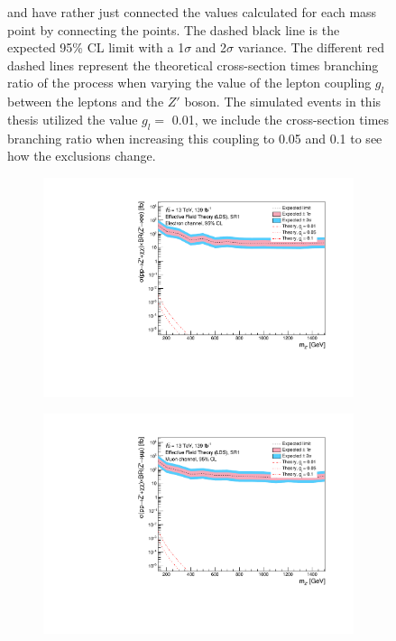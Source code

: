 \documentclass[12pt, a4paper]{book}
\begin{document}
\begin{figure}[!ht]
{   and have rather just connected the values calculated for each mass point by connecting the points. The dashed black line is the expected 95\% CL limit with a 1$\sigma$ and 2$\sigma$ variance. 
   The different red dashed lines represent the theoretical cross-section times branching ratio of the process when varying the value of the lepton coupling $g_l$ between the leptons and the $Z'$ boson. The simulated events in this thesis utilized the value $g_l=$ 0.01, we include the cross-section times branching ratio when increasing this coupling to 0.05 and 0.1 to see how the exclusions change.  }\label{fig:EFT_LDS_exclusion_ee_uu}
\end{figure}

\begin{figure}[!ht]
	\centering
	\begin{subfigure}[b]{0.49\textwidth}
      \centering
      \includegraphics[width=1\textwidth]{Limits/Model_independent/50-100/EFT_LDS/mass_exclusion_ee.pdf}
   \end{subfigure}
   \hfill
   \begin{subfigure}[b]{0.49\textwidth}
      \centering
      \includegraphics[width=1\textwidth]{Limits/Model_independent/50-100/EFT_LDS/mass_exclusion_uu.pdf}

\end{subfigure}
\end{figure}
\end{document}
